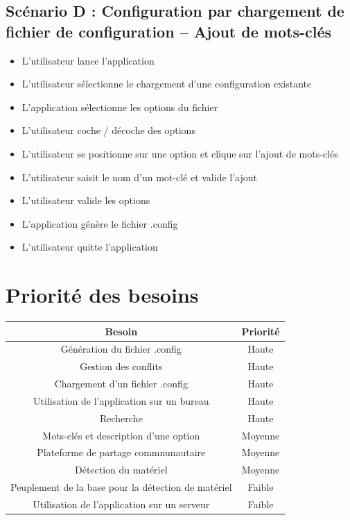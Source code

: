 \documentclass[16pts]{report}
\begin{document}
\section{Scénario D : Configuration par chargement de fichier de configuration
-- Ajout de mots-clés}
\label{sec:Scénario D : Configuration par chargement de fichier de
configuration -- Ajout de mots-clés}

\begin{itemize}
    \item L'utilisateur lance l'application
    \item L'utilisateur sélectionne le chargement d'une configuration existante
    \item L'application sélectionne les options du fichier
    \item L'utilisateur coche / décoche des options
    \item L'utilisateur se positionne sur une option et clique sur l'ajout de
        mots-clés
    \item L'utilisateur saisit le nom d'un mot-clé et valide l'ajout
    \item L'utilisateur valide les options
    \item L'application génère le fichier .config
    \item L'utilisateur quitte l'application
\end{itemize}


\chapter{Priorité des besoins}
\label{cha:Priorité des besoins}

\begin{tabular}{|c|c|}
    \hline
    Besoin & Priorité \\
    \hline
    \hline
    Génération du fichier .config & Haute \\
    \hline
    Gestion des conflits & Haute \\
    \hline
    Chargement d'un fichier .config & Haute \\
    \hline
    Utilisation de l'application sur un bureau & Haute \\
    \hline
    Recherche & Haute \\
    \hline
    Mots-clés et description d'une option & Moyenne \\
    \hline
    Plateforme de partage commnunautaire & Moyenne \\
    \hline
    Détection du matériel & Moyenne \\
    \hline
    Peuplement de la base pour la détection de matériel & Faible \\
    \hline
    Utilisation de l'application sur un serveur & Faible \\
    \hline
\end{tabular}
\end{document}
